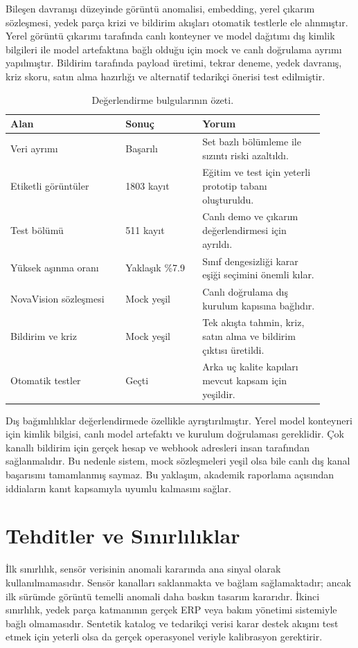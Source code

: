 \documentclass[conference]{IEEEtran}
\begin{document}
Bileşen davranışı düzeyinde görüntü anomalisi, embedding, yerel çıkarım sözleşmesi, yedek parça krizi ve bildirim akışları otomatik testlerle ele alınmıştır. Yerel görüntü çıkarımı tarafında canlı konteyner ve model dağıtımı dış kimlik bilgileri ile model artefaktına bağlı olduğu için mock ve canlı doğrulama ayrımı yapılmıştır. Bildirim tarafında payload üretimi, tekrar deneme, yedek davranış, kriz skoru, satın alma hazırlığı ve alternatif tedarikçi önerisi test edilmiştir.

\begin{table}[H]
\centering
\caption{Değerlendirme bulgularının özeti.}
\label{tab:evaluation}
\begin{tabular}{p{0.33\linewidth}p{0.22\linewidth}p{0.35\linewidth}}
\toprule
Alan & Sonuç & Yorum \\
\midrule
Veri ayrımı & Başarılı & Set bazlı bölümleme ile sızıntı riski azaltıldı. \\
Etiketli görüntüler & 1803 kayıt & Eğitim ve test için yeterli prototip tabanı oluşturuldu. \\
Test bölümü & 511 kayıt & Canlı demo ve çıkarım değerlendirmesi için ayrıldı. \\
Yüksek aşınma oranı & Yaklaşık \%7.9 & Sınıf dengesizliği karar eşiği seçimini önemli kılar. \\
NovaVision sözleşmesi & Mock yeşil & Canlı doğrulama dış kurulum kapısına bağlıdır. \\
Bildirim ve kriz & Mock yeşil & Tek akışta tahmin, kriz, satın alma ve bildirim çıktısı üretildi. \\
Otomatik testler & Geçti & Arka uç kalite kapıları mevcut kapsam için yeşildir. \\
\bottomrule
\end{tabular}
\end{table}

Dış bağımlılıklar değerlendirmede özellikle ayrıştırılmıştır. Yerel model konteyneri için kimlik bilgisi, canlı model artefaktı ve kurulum doğrulaması gereklidir. Çok kanallı bildirim için gerçek hesap ve webhook adresleri insan tarafından sağlanmalıdır. Bu nedenle sistem, mock sözleşmeleri yeşil olsa bile canlı dış kanal başarısını tamamlanmış saymaz. Bu yaklaşım, akademik raporlama açısından iddiaların kanıt kapsamıyla uyumlu kalmasını sağlar.

\section{Tehditler ve Sınırlılıklar}
İlk sınırlılık, sensör verisinin anomali kararında ana sinyal olarak kullanılmamasıdır. Sensör kanalları saklanmakta ve bağlam sağlamaktadır; ancak ilk sürümde görüntü temelli anomali daha baskın tasarım kararıdır. İkinci sınırlılık, yedek parça katmanının gerçek ERP veya bakım yönetimi sistemiyle bağlı olmamasıdır. Sentetik katalog ve tedarikçi verisi karar destek akışını test etmek için yeterli olsa da gerçek operasyonel veriyle kalibrasyon gerektirir.
\end{document}
